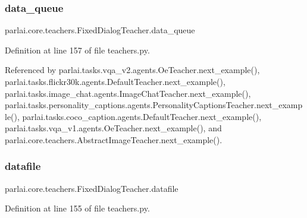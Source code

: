 \mbox{\label{classparlai_1_1core_1_1teachers_1_1FixedDialogTeacher_a59d9cf6a9e7f64a5d9a8d180ed06c001}} 
\subsubsection{\texorpdfstring{data\+\_\+queue}{data\_queue}}
{\footnotesize\ttfamily parlai.\+core.\+teachers.\+Fixed\+Dialog\+Teacher.\+data\+\_\+queue}



Definition at line 157 of file teachers.\+py.



Referenced by parlai.\+tasks.\+vqa\+\_\+v2.\+agents.\+Oe\+Teacher.\+next\+\_\+example(), parlai.\+tasks.\+flickr30k.\+agents.\+Default\+Teacher.\+next\+\_\+example(), parlai.\+tasks.\+image\+\_\+chat.\+agents.\+Image\+Chat\+Teacher.\+next\+\_\+example(), parlai.\+tasks.\+personality\+\_\+captions.\+agents.\+Personality\+Captions\+Teacher.\+next\+\_\+example(), parlai.\+tasks.\+coco\+\_\+caption.\+agents.\+Default\+Teacher.\+next\+\_\+example(), parlai.\+tasks.\+vqa\+\_\+v1.\+agents.\+Oe\+Teacher.\+next\+\_\+example(), and parlai.\+core.\+teachers.\+Abstract\+Image\+Teacher.\+next\+\_\+example().

\mbox{\label{classparlai_1_1core_1_1teachers_1_1FixedDialogTeacher_a822d9f5c86ab0b0c608ae26901d3dec3}} 
\subsubsection{\texorpdfstring{datafile}{datafile}}
{\footnotesize\ttfamily parlai.\+core.\+teachers.\+Fixed\+Dialog\+Teacher.\+datafile}



Definition at line 155 of file teachers.\+py.



